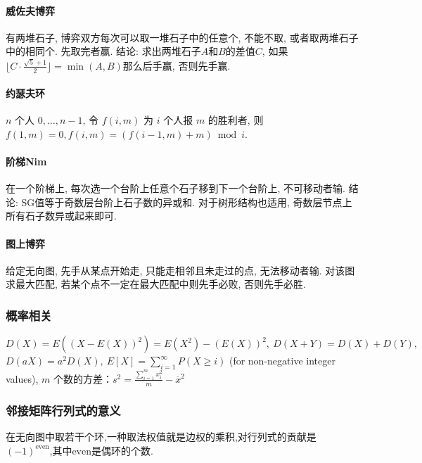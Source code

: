\paragraph{威佐夫博弈}有两堆石子, 博弈双方每次可以取一堆石子中的任意个, 不能不取, 或者取两堆石子中的相同个. 先取完者赢. 结论: 求出两堆石子$A$和$B$的差值$C$, 如果$\lfloor C \cdot \frac{\sqrt{5}+1}{2}\rfloor=\min(A,B)$那么后手赢, 否则先手赢. 
\paragraph{约瑟夫环}$n$ 个人 $0,\dots,n-1$, 令 $f(i,m)$ 为 $i$ 个人报 $m$ 的胜利者, 则 $f(1,m)=0,f(i,m)=(f(i-1,m)+m)\bmod i$. 
\paragraph{阶梯Nim} 在一个阶梯上, 每次选一个台阶上任意个石子移到下一个台阶上, 不可移动者输. 结论: SG值等于奇数层台阶上石子数的异或和. 对于树形结构也适用, 奇数层节点上所有石子数异或起来即可.
\paragraph{图上博弈} 给定无向图, 先手从某点开始走, 只能走相邻且未走过的点, 无法移动者输. 对该图求最大匹配, 若某个点不一定在最大匹配中则先手必败, 否则先手必胜.


\subsubsection{概率相关}
$D(X)=E((X-E(X))^2)=E(X^2)-(E(X))^2,\ D(X+Y)=D(X)+D(Y),$\\
$D(aX)=a^2D(X),\ E[X]=\sum_{i=1}^{\infty}P(X\geq i)$ (for non-negative integer values), $m$ 个数的方差：$s^2=\frac{\sum_{i=1}^m x_i^2}m-\overline{x}^2$

\subsubsection{邻接矩阵行列式的意义}
在无向图中取若干个环,一种取法权值就是边权的乘积,对行列式的贡献是$(-1)^{\text{even}}$,其中$\text{even}$是偶环的个数.

